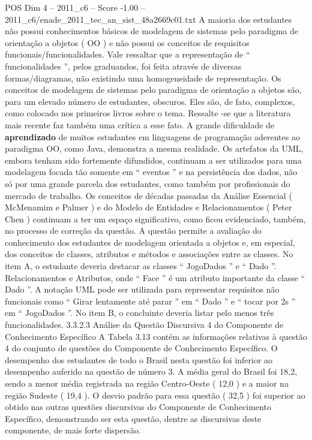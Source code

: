 \begin{textsample}{POS Dim 4 – 2011\_c6 – Score -1.00 – 2011\_c6/enade\_2011\_tec\_an\_sist\_48a2669c01.txt}
A maioria dos estudantes não possui conhecimentos básicos de modelagem de sistemas pelo paradigma de orientação a objetos ( OO ) e não possui os conceitos de requisitos funcionais/funcionalidades.
Vale ressaltar que a representação de “ funcionalidades ”, pelos graduandos, foi feita através de diversas formas/diagramas, não existindo uma homogeneidade de representação.
Os conceitos de modelagem de sistemas pelo paradigma de orientação a objetos são, para um elevado número de estudantes, obscuros.
Eles são, de fato, complexos, como colocado nos primeiros livros sobre o tema.
Ressalte -se que a literatura mais recente faz também uma crítica a esse fato.
A grande dificuldade de \textbf{aprendizado} de muitos estudantes em linguagens de programação aderentes ao paradigma OO, como Java, demonstra a mesma realidade.
Os artefatos da UML, embora tenham sido fortemente difundidos, continuam a ser utilizados para uma modelagem focada tão somente em “ eventos ” e na persistência dos dados, não só por uma grande parcela dos estudantes, como também por profissionais do mercado de trabalho.
Os conceitos de décadas passadas da Análise Essencial ( McMenamim e Palmer ) e do Modelo de Entidades e Relacionamentos ( Peter Chen ) continuam a ter um espaço significativo, como ficou evidenciado, também, no processo de correção da questão.
A questão permite a avaliação do conhecimento dos estudantes de modelagem orientada a objetos e, em especial, dos conceitos de classes, atributos e métodos e associações entre as classes.
No item A, o estudante deveria destacar as classes “ JogoDados ” e “ Dado ”.
Relacionamentos e Atributos, onde “ Face ” é um atributo importante da classe “ Dado ”.
A notação UML pode ser utilizada para representar requisitos não funcionais como “ Girar lentamente até parar ” em “ Dado ” e “ tocar por 2s ” em “ JogoDados ”.
No item B, o concluinte deveria listar pelo menos três funcionalidades. 3.3.2.3 Análise da Questão Discursiva 4 do Componente de Conhecimento Específico A Tabela 3.13 contém as informações relativas à questão 4 do conjunto de questões do Componente de Conhecimento Específico.
O desempenho dos estudantes de todo o Brasil nesta questão foi inferior ao desempenho auferido na questão de número 3.
A média geral do Brasil foi 18,2, sendo a menor média registrada na região Centro-Oeste ( 12,0 ) e a maior na região Sudeste ( 19,4 ).
O desvio padrão para essa questão ( 32,5 ) foi superior ao obtido nas outras questões discursivas do Componente de Conhecimento Específico, demonstrando ser esta questão, dentre as discursivas deste componente, de mais forte dispersão.

\end{textsample}
